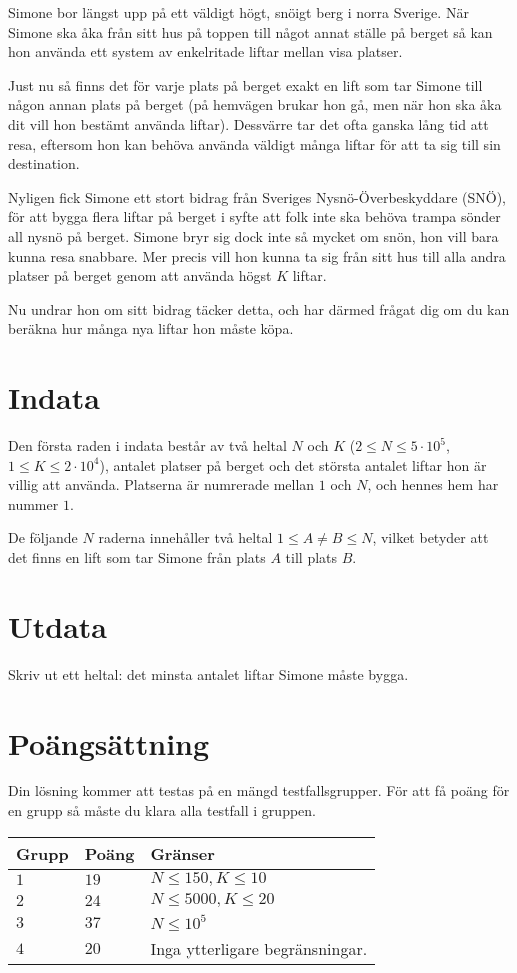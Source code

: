 
Simone bor längst upp på ett väldigt högt, snöigt berg i norra Sverige. När Simone ska åka från sitt hus på toppen till något annat ställe på berget så kan hon använda ett system av enkelritade liftar mellan visa platser.

Just nu så finns det för varje plats på berget exakt en lift som tar Simone till någon annan plats på berget (på hemvägen brukar hon gå, men när hon ska åka dit vill hon bestämt använda liftar). Dessvärre tar det ofta ganska lång tid att resa, eftersom hon kan behöva använda väldigt många liftar för att ta sig till sin destination.

Nyligen fick Simone ett stort bidrag från Sveriges Nysnö-Överbeskyddare (SNÖ), för att bygga flera liftar på berget i syfte att folk inte ska behöva trampa sönder all nysnö på berget. Simone bryr sig dock inte så mycket om snön, hon vill bara kunna resa snabbare. Mer precis vill hon kunna ta sig från sitt hus till alla andra platser på berget genom att använda högst $K$ liftar.

Nu undrar hon om sitt bidrag täcker detta, och har därmed frågat dig om du kan beräkna hur många nya liftar hon måste köpa.

\section*{Indata}
Den första raden i indata består av två heltal $N$ och $K$ ($2 \le N \leq 5 \cdot 10^5$, $1 \le K \leq 2 \cdot 10^4$),
antalet platser på berget och det största antalet liftar hon är villig att använda. Platserna är numrerade mellan
$1$ och $N$, och hennes hem har nummer $1$.

De följande $N$ raderna innehåller två heltal $1 \le A \not= B \le N$, vilket betyder att det finns en lift som tar Simone från plats $A$ till plats $B$.

\section*{Utdata}
Skriv ut ett heltal: det minsta antalet liftar Simone måste bygga.

\section*{Poängsättning}
Din lösning kommer att testas på en mängd testfallsgrupper.
För att få poäng för en grupp så måste du klara alla testfall i gruppen.

\noindent
\begin{tabular}{| l | l | p{12cm} |}
  \hline
  \textbf{Grupp} & \textbf{Poäng} & \textbf{Gränser} \\ \hline
  $1$    & $19$      & $N \leq 150, K \leq 10$ \\ \hline
  $2$    & $24$      & $N \leq 5000, K \leq 20$ \\ \hline
  $3$    & $37$      & $N \leq 10^5$ \\ \hline
  $4$    & $20$      & Inga ytterligare begränsningar. \\ \hline
\end{tabular}
